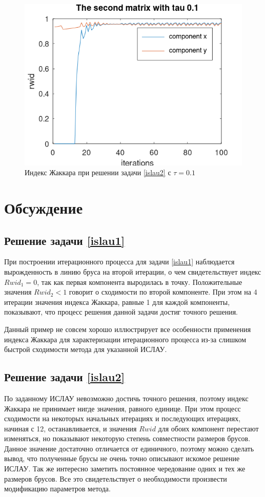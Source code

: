 \documentclass[12pt,a4paper]{article}
\begin{document}
\begin{figure}[H]
    \centering
    \includegraphics[scale=0.6]{Images/rwid3.png}
    \caption{Индекс Жаккара при решении задачи \eqref{islau2} с $\tau=0.1$}
\end{figure}

\section{Обсуждение}
\subsection{Решение задачи \eqref{islau1}}
При построении итерационного процесса для задачи \eqref{islau1} наблюдается вырожденность в линию бруса на второй итерации, о чем свидетельствует индекс $Rwid_1=0$, так как первая компонента выродилась в точку. Положительные значения $Rwid_2<1$ говорит о сходимости по второй компоненте. При этом на 4 итерации значения индекса Жаккара, равные 1 для каждой компоненты, показывают, что процесс решения данной задачи достиг точного решения.

Данный пример не совсем хорошо иллюстрирует все особенности применения индекса Жаккара для характеризации итерационного процесса из-за слишком быстрой сходимости метода для указанной ИСЛАУ.

\subsection{Решение задачи \eqref{islau2}}
По заданному ИСЛАУ невозможно достичь точного решения, поэтому индекс Жаккара не принимает нигде значения, равного единице. При этом процесс сходимости на некоторых начальных итерациях и последующих итерациях, начиная с 12, останавливается, и значения $Rwid$ для обоих компонент перестают изменяться, но показывают некоторую степень совместности размеров брусов. Данное значение достаточно отличается от единичного, поэтому можно сделать вывод, что полученные брусы не очень точно описывают искомое решение ИСЛАУ. Так же интересно заметить постоянное чередование одних и тех же размеров брусов. Все это свидетельствует о необходимости произвести модификацию параметров метода.
\end{document}
